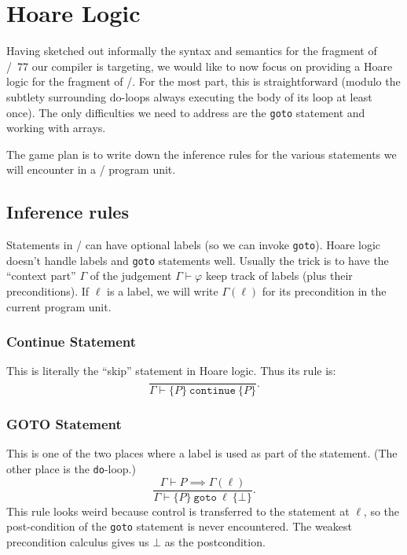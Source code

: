 \section{Hoare Logic}
Having sketched out informally the syntax and semantics for the fragment
of \FORTRAN/~77 our compiler is targeting, we would like to now focus on
providing a Hoare logic for the fragment of \FORTRAN/. For the most
part, this is straightforward (modulo the subtlety surrounding do-loops
always executing the body of its loop at least once). The only
difficulties we need to address are the \texttt{goto} statement and
working with arrays.

The game plan is to write down the inference rules for the various
statements we will encounter in a \FORTRAN/ program unit.

\subsection{Inference rules}
Statements in \FORTRAN/ can have optional labels (so we can invoke
\texttt{goto}). Hoare logic doesn't handle labels and \texttt{goto}
statements well. Usually the trick is to have the ``context part'' $\Gamma$ of
the judgement $\Gamma\vdash\varphi$ keep track of labels (plus their
preconditions). If $\ell$ is a label, we will write $\Gamma(\ell)$ for
its precondition in the current program unit.

\subsubsection{Continue Statement}
This is literally the ``skip'' statement in Hoare logic. Thus its rule is:
\begin{equation}
\frac{}{\Gamma\vdash\{P\}~\mathtt{continue}~\{P\}}.
\end{equation}

\subsubsection{GOTO Statement}
This is one of the two places where a label is used as part of the
statement. (The other place is the \texttt{do}-loop.)
\begin{equation}
\frac{\Gamma\vdash P\implies\Gamma(\ell)}{\Gamma\vdash\{P\}~\mathtt{goto}~\ell~\{\bot\}}.
\end{equation}
This rule looks weird because control is transferred to the statement
at $\ell$, so the post-condition of the \texttt{goto} statement is never
encountered. The weakest precondition calculus gives us $\bot$ as the
postcondition.

